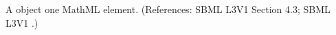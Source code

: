 A \FunctionDefinition object  one MathML 
element.  (References: SBML L3V1 Section 4.3; SBML L3V1 .)
